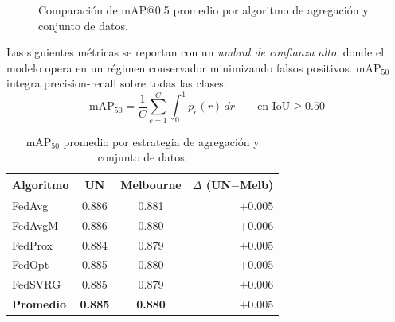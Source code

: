 \begin{figure}[H]
  \centering
  \caption{Comparación de mAP@0.5 promedio por algoritmo de agregación y conjunto de datos.}
  \label{fig:map_bar}
\end{figure}

Las siguientes métricas se reportan con un \emph{umbral de confianza alto}, donde el
modelo opera en un régimen conservador minimizando falsos positivos.
$\mathrm{mAP}_{50}$ integra precision-recall sobre todas las clases:
\[
  \mathrm{mAP}_{50} = \frac{1}{C}\sum_{c=1}^{C}\int_0^1 p_c(r)\,dr
  \qquad\text{en } \mathrm{IoU} \ge 0.50
\]

\medskip
\begin{table}[H]
  \centering
  \caption{mAP$_{50}$ promedio por estrategia de agregación y conjunto de datos.}
  \small
  \begin{tabular}{lccr}
    \toprule
    \textbf{Algoritmo} & \textbf{UN} & \textbf{Melbourne} & $\Delta$ \textbf{(UN$-$Melb)} \\
    \midrule
    FedAvg  & 0.886 & 0.881 & $+$0.005 \\
    FedAvgM & 0.886 & 0.880 & $+$0.006 \\
    FedProx & 0.884 & 0.879 & $+$0.005 \\
    FedOpt  & 0.885 & 0.880 & $+$0.005 \\
    FedSVRG & 0.885 & 0.879 & $+$0.006 \\
    \midrule
    \textbf{Promedio} & \textbf{0.885} & \textbf{0.880} & $+$0.005 \\
    \bottomrule
  \end{tabular}
\end{table}

